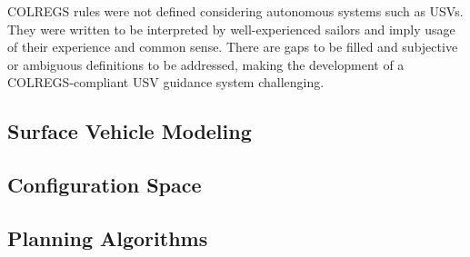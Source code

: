     \ac{COLREGS} rules were not defined considering autonomous systems such as \ac{USV}s. They were written to be interpreted by well-experienced sailors and imply usage of their experience and common sense. There are gaps to be filled and subjective or ambiguous definitions to be addressed, making the development of a \ac{COLREGS}-compliant \ac{USV} guidance system challenging.

    \subsection{Surface Vehicle Modeling}
    \subsection{Configuration Space}
    \subsection{Planning Algorithms}